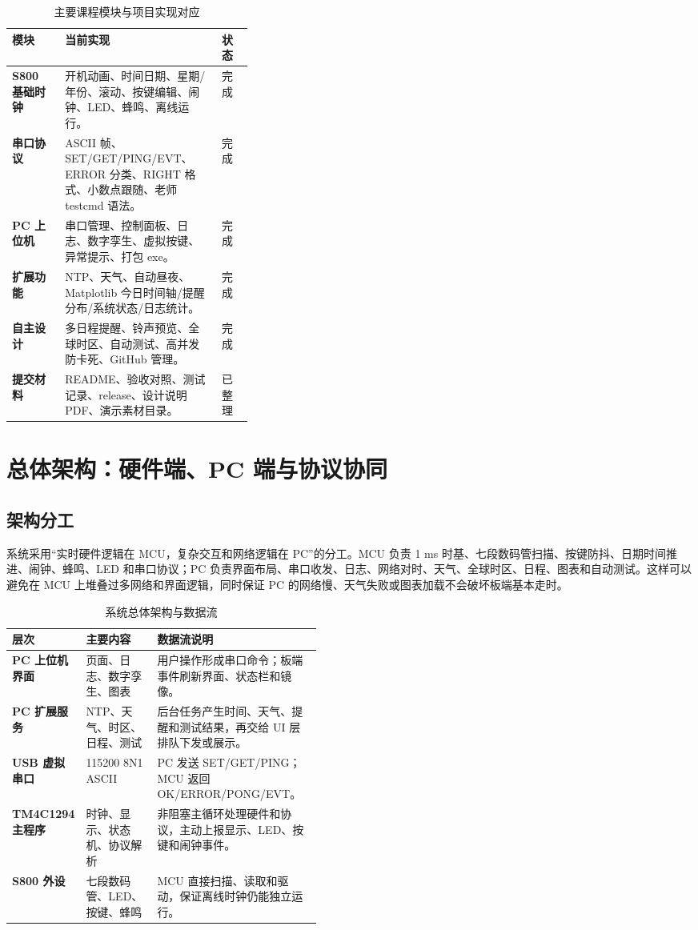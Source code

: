 \documentclass[UTF8,zihao=-4,a4paper]{ctexart}
\begin{document}
\begin{table}[!htbp]
\centering
\caption{主要课程模块与项目实现对应}
\begin{tabularx}{\linewidth}{>{\bfseries}p{0.22\linewidth}X>{\centering\arraybackslash}p{0.13\linewidth}}
\toprule
模块 & 当前实现 & 状态\\
\midrule
S800 基础时钟 & 开机动画、时间日期、星期/年份、滚动、按键编辑、闹钟、LED、蜂鸣、离线运行。 & 完成\\
串口协议 & ASCII 帧、SET/GET/PING/EVT、ERROR 分类、RIGHT 格式、小数点跟随、老师 testcmd 语法。 & 完成\\
PC 上位机 & 串口管理、控制面板、日志、数字孪生、虚拟按键、异常提示、打包 exe。 & 完成\\
扩展功能 & NTP、天气、自动昼夜、Matplotlib 今日时间轴/提醒分布/系统状态/日志统计。 & 完成\\
自主设计 & 多日程提醒、铃声预览、全球时区、自动测试、高并发防卡死、GitHub 管理。 & 完成\\
提交材料 & README、验收对照、测试记录、release、设计说明 PDF、演示素材目录。 & 已整理\\
\bottomrule
\end{tabularx}
\end{table}

\section{总体架构：硬件端、PC 端与协议协同}
\subsection{架构分工}
系统采用“实时硬件逻辑在 MCU，复杂交互和网络逻辑在 PC”的分工。MCU 负责 1 ms 时基、七段数码管扫描、按键防抖、日期时间推进、闹钟、蜂鸣、LED 和串口协议；PC 负责界面布局、串口收发、日志、网络对时、天气、全球时区、日程、图表和自动测试。这样可以避免在 MCU 上堆叠过多网络和界面逻辑，同时保证 PC 的网络慢、天气失败或图表加载不会破坏板端基本走时。

\begin{table}[H]
\centering
\caption{系统总体架构与数据流}
\begin{tabularx}{\linewidth}{>{\bfseries}p{0.22\linewidth}p{0.23\linewidth}X}
\toprule
层次 & 主要内容 & 数据流说明\\
\midrule
PC 上位机界面 & 页面、日志、数字孪生、图表 & 用户操作形成串口命令；板端事件刷新界面、状态栏和镜像。\\
PC 扩展服务 & NTP、天气、时区、日程、测试 & 后台任务产生时间、天气、提醒和测试结果，再交给 UI 层排队下发或展示。\\
USB 虚拟串口 & 115200 8N1 ASCII & PC 发送 SET/GET/PING；MCU 返回 OK/ERROR/PONG/EVT。\\
TM4C1294 主程序 & 时钟、显示、状态机、协议解析 & 非阻塞主循环处理硬件和协议，主动上报显示、LED、按键和闹钟事件。\\
S800 外设 & 七段数码管、LED、按键、蜂鸣 & MCU 直接扫描、读取和驱动，保证离线时钟仍能独立运行。\\
\bottomrule
\end{tabularx}
\end{table}
\end{document}

